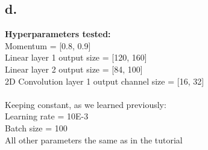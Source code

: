 \documentclass{article}
\newcommand{\1}{\mathbf{1}}
\begin{document}
{\newpage

\subsection*{d.}

\textbf{Hyperparameters tested:} \\
Momentum = [0.8, 0.9] \\
Linear layer 1 output size = [120, 160] \\ 
Linear layer 2 output size = [84, 100] \\
2D Convolution layer 1 output channel size = [16, 32] \\ \\
Keeping constant, as we learned previously: \\
Learning rate = 10E-3 \\
Batch size = 100 \\
All other parameters the same as in the tutorial 

\begin{figure}[h]
  \centering
\end{figure}

}
\end{document}
